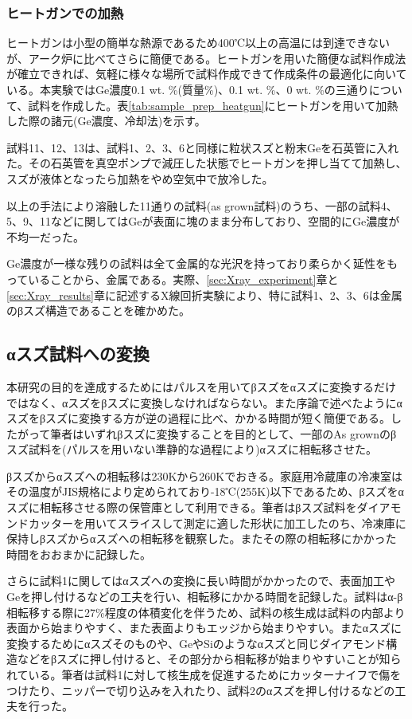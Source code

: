 \subsubsection{ヒートガンでの加熱}
ヒートガンは小型の簡単な熱源であるため400℃以上の高温には到達できないが、アーク炉に比べてさらに簡便である。ヒートガンを用いた簡便な試料作成法が確立できれば、気軽に様々な場所で試料作成できて作成条件の最適化に向いている。本実験ではGe濃度0.1 wt. \%(質量\%)、0.1 wt. \%、0 wt. \%の三通りについて、試料を作成した。表\ref{tab:sample_prep_heatgun}にヒートガンを用いて加熱した際の諸元(Ge濃度、冷却法)を示す。

試料11、12、13は、試料1、2、3、6と同様に粒状スズと粉末Geを石英管に入れた。その石英管を真空ポンプで減圧した状態でヒートガンを押し当てて加熱し、スズが液体となったら加熱をやめ空気中で放冷した。

以上の手法により溶融した11通りの試料(as grown試料)のうち、一部の試料4、5、9、11などに関してはGeが表面に塊のまま分布しており、空間的にGe濃度が不均一だった。

Ge濃度が一様な残りの試料は全て金属的な光沢を持っており柔らかく延性をもっていることから、金属である。実際、\ref{sec:Xray_experiment}章と\ref{sec:Xray_results}章に記述するX線回折実験により、特に試料1、2、3、6は金属のβスズ構造であることを確かめた。

\subsection{αスズ試料への変換}
本研究の目的を達成するためにはパルスを用いてβスズをαスズに変換するだけではなく、αスズをβスズに変換しなければならない。また序論で述べたようにαスズをβスズに変換する方が逆の過程に比べ、かかる時間が短く簡便である。したがって筆者はいずれβスズに変換することを目的として、一部のAs grownのβスズ試料を(パルスを用いない準静的な過程により)αスズに相転移させた。

βスズからαスズへの相転移は230Kから260Kでおきる\cite{Matvienko,Ogino,Cornelius}。家庭用冷蔵庫の冷凍室はその温度がJIS規格により定められており-18℃(255K)以下であるため、βスズをαスズに相転移させる際の保管庫として利用できる。筆者はβスズ試料をダイアモンドカッターを用いてスライスして測定に適した形状に加工したのち、冷凍庫に保持しβスズからαスズへの相転移を観察した。またその際の相転移にかかった時間をおおまかに記録した。

さらに試料1に関してはαスズへの変換に長い時間がかかったので、表面加工やGeを押し付けるなどの工夫を行い、相転移にかかる時間を記録した。試料はα-β相転移する際に27\%程度の体積変化を伴うため、試料の核生成は試料の内部より表面から始まりやすく、また表面よりもエッジから始まりやすい\cite{Cornelius}。またαスズに変換するためにαスズそのものや、GeやSiのようなαスズと同じダイアモンド構造などをβスズに押し付けると、その部分から相転移が始まりやすいことが知られている\cite{Cornelius}。筆者は試料1に対して核生成を促進するためにカッターナイフで傷をつけたり、ニッパーで切り込みを入れたり、試料2のαスズを押し付けるなどの工夫を行った。

